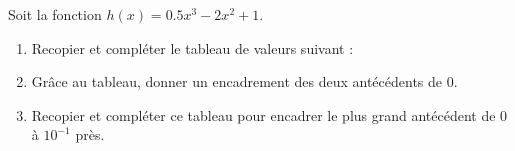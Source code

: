 \begin{corrige}
    Soit la fonction $h(x)=\num{0.5}x^3-2x^2+1$.

    \begin{enumerate}
        \item Recopier et compléter le tableau de valeurs suivant :        
        
        \smallskip

        \smallskip
        \item Grâce au tableau, donner un encadrement des deux antécédents de $0$.
        \item Recopier et compléter ce tableau pour encadrer le plus grand antécédent de $0$ à $10^{-1}$ près.
        
        \smallskip
        \hspace*{-9mm}
    \end{enumerate}
\end{corrige}
